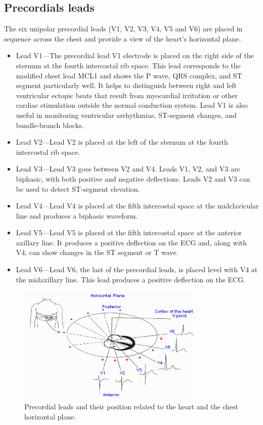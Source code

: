 \subsection{Precordials leads}
The six unipolar precordial leads (V1, V2, V3, V4, V5  and V6) are placed in sequence across the chest and provide a view of the heart’s horizontal plane.
\begin{itemize}
	\item Lead V1—The precordial lead V1 electrode is placed on the right side of the sternum at the fourth intercostal rib space. This lead corresponds to the modified chest lead MCL1 and shows the P wave, QRS complex, and ST segment particularly well. It helps to distinguish between right and left ventricular ectopic beats that result from myocardial irritation or other cardiac stimulation outside the normal conduction system. Lead V1 is also useful in monitoring ventricular arrhythmias, ST-segment changes, and bundle-branch blocks.
	\item Lead V2—Lead V2 is placed at the left of the sternum at the fourth intercostal rib space.
	\item  Lead V3—Lead V3 goes between V2 and V4. Leads V1, V2, and V3 are biphasic, with both positive and negative deflections. Leads V2 and V3 can be used to detect ST-segment elevation.
	\item Lead V4—Lead V4 is placed at the fifth intercostal space at the midclavicular line and produces a biphasic waveform.
	\item Lead V5—Lead V5 is placed at the fifth intercostal space at the anterior axillary line. It produces a positive deflection on the ECG and, along with V4, can show changes in the ST segment or T wave.
	\item Lead V6—Lead V6, the last of the precordial leads, is placed level with V4 at the midaxillary line. This lead produces a positive deflection on the ECG.
\end{itemize}
\begin{figure}[ht!]
	\centering
	\includegraphics[width=90mm]{figures/ch2/7.png}
	\caption{Precordial leads and their position related to the heart and the chest horizontal plane.}
	\label{fig2.7}
\end{figure}

